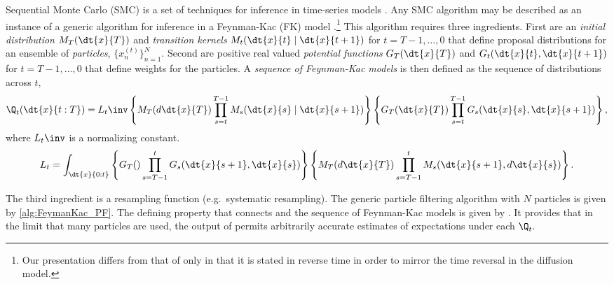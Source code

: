 \iffalse 
Sequential Monte Carlo (SMC) is a set of techniques for inference in time-series models \citep{doucet2001sequential,naesseth2019elements,chopin2020introduction}.
Any SMC algorithm may be described as an instance of a generic algorithm for inference in a Feynman-Kac (FK) model
\citep[Algorithm 10.1]{chopin2020introduction}.\footnote{Our presentation differs from that of \citet{chopin2020introduction} only in that it is stated in reverse time in order to mirror the time reversal in the diffusion model.}
This algorithm requires three ingredients.
First are an \emph{initial distribution} $M_T(\dt{x}{T})$ and \emph{transition kernels} $M_t(\dt{x}{t}\mid \dt{x}{t+1})$ for $t=T-1, \dots, 0$
that define proposal distributions for an ensemble of \emph{particles},  $\{ x^{(t)}_n\}_{n=1}^N$.
Second are positive real valued \emph{potential functions} $G_T(\dt{x}{T})$ and $G_t(\dt{x}{t}, \dt{x}{t+1})$ for $t=T-1, \dots, 0$ that define weights for the particles.
A \emph{sequence of Feynman-Kac models} is then defined as the sequence of distributions across $t,$
\begin{equation}\label{eqn:feynman_kac_sequence}
    \Q_t(\dt{x}{t:T})=L_t\inv 
        \left\{M_T(d\dt{x}{T}) \prod_{s=t}^{T-1} M_s(\dt{x}{s}\mid  \dt{x}{s+1})\right\}
        \left\{G_T(\dt{x}{T})\prod_{s=t}^{T-1} G_s(\dt{x}{s}, \dt{x}{s+1})\right\}
    ,
\end{equation}
where $L_t\inv$ is a normalizing constant.%
\begin{equation}
L_t =  \int_{\dt{x}{0:t}} \left\{ G_T()\prod_{s=T-1}^t G_s(\dt{x}{s+1}, \dt{x}{s})\right\}
\left\{M_T(d\dt{x}{T}) \prod_{s=T-1}^t M_s(\dt{x}{s+1}, d \dt{x}{s})\right\}.
\end{equation}

The third ingredient is a resampling function (e.g.\ systematic resampling).
The generic particle filtering algorithm with $N$ particles is given by \cref{alg:FeymanKac_PF}.
The defining property that connects  and the sequence of Feynman-Kac models is given by .
It provides that in the limit that many particles are used, 
the output of  permits arbitrarily accurate estimates of expectations under each $\Q_t.$


